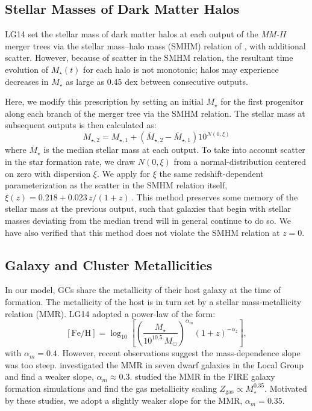 \documentclass[fleqn,usenatbib]{mnras}
\newcommand{\rev}[1]{\textcolor{black}{#1}}
\newcommand{\Msun}{\,M_{\odot}}
\newcommand{\Mstar}{M_{\star}}
\newcommand{\feh}{\mathrm{[Fe/H]}}
\begin{document}
\subsection{Stellar Masses of Dark Matter Halos}
\label{sec:stellar_mass}

LG14 set the stellar mass of dark matter halos at each output of the \textit{MM-II} merger trees via the stellar mass--halo mass (SMHM) relation of \cite{behroozi_etal13b}, with additional scatter. However, because of scatter in the SMHM relation, the resultant time evolution of $\Mstar(t)$ for each halo is not monotonic; halos may experience decreases in $\Mstar$ as large as 0.45 dex between consecutive outputs.

Here, we modify this prescription by setting an initial $\Mstar$ for the first progenitor along each branch of the merger tree via the SMHM relation. The stellar mass at subsequent outputs is then calculated as:
\begin{equation}
  M_{\star,2} = M_{\star,1} + \left(\overline{M}_{\star,2} - \overline{M}_{\star,1}\right) 10^{N(0,\xi)}
  \label{eqn:sm_growth}
\end{equation}
where $\overline\Mstar$ is the median stellar mass at each output. To take into account scatter in the \rev{star formation rate,} we draw $N(0,\xi)$ from a normal-distribution centered on zero with dispersion $\xi$. We apply for $\xi$ the same redshift-dependent parameterization as the scatter in the SMHM relation itself, $\xi(z) = 0.218 + 0.023\, z/(1+z)\,$. This method preserves some memory of the stellar mass at the previous output, such that galaxies that begin with stellar masses deviating from the median trend will in general continue to do so. We have also verified that this method does not violate the SMHM relation at $z=0$.

\subsection{Galaxy and Cluster Metallicities}
\label{sec:metallicity}

In our model, GCs share the metallicity of their host galaxy at the time of formation. The metallicity of the host is in turn set by a stellar mass-metallicity relation (MMR). LG14 adopted a power-law of the form:
\begin{equation}
  \feh =  \log_{10}\left[\left(\frac{\Mstar}{10^{10.5}\Msun}\right)^{\alpha_m} (1+z)^{-\alpha_z}\right],
  \label{eq:mmr}
\end{equation}
with $\alpha_m = 0.4$. However, recent observations suggest the mass-dependence slope was too steep. \citet{kirby_etal13} investigated the MMR in seven dwarf galaxies in the Local Group and find a weaker slope, $\alpha_m \approx 0.3$. \citet{ma_etal_2016} studied the MMR in the FIRE galaxy formation simulations and find the gas metallicity scaling $Z_{\mathrm{gas}} \propto \Mstar^{0.35}$. Motivated by these studies, we adopt a slightly weaker slope for the MMR, $\alpha_m = 0.35$.
\end{document}

